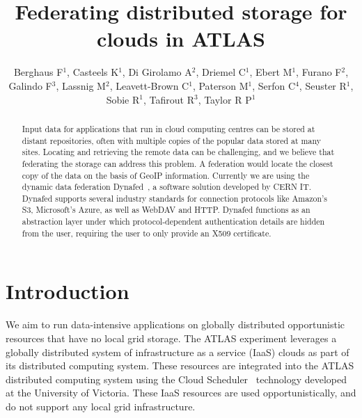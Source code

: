 \documentclass[a4paper]{jpconf}
\begin{document}
\title{Federating distributed storage for clouds in ATLAS}


\author{Berghaus F$^1$, Casteels K$^1$, Di Girolamo A$^2$, Driemel C$^1$, Ebert M$^1$, Furano F$^2$, Galindo F$^3$, Lassnig M$^2$, Leavett-Brown C$^1$, Paterson M$^1$, Serfon C$^4$, Seuster R$^1$, Sobie R$^1$, Tafirout R$^3$, Taylor R P$^1$}
\address{$^1$ University of Victoria, Canada\\$^2$ CERN,  Switzerland\\$^3$ TRIUMF, Canada\\$^4$ University of Oslo, Norway}


\begin{abstract}
Input data for applications that run in cloud computing centres can be stored at distant repositories, often with multiple copies of the popular data stored at many sites. Locating and retrieving the remote data can be challenging, and we believe that federating the storage can address this problem. A federation would locate the closest copy of the data on the basis of GeoIP information. Currently we are using the dynamic data federation Dynafed~\cite{dynafed}, a software solution developed by CERN IT. Dynafed supports several industry standards for connection protocols like Amazon's S3, Microsoft's Azure, as well as WebDAV and HTTP. Dynafed functions as an abstraction layer under which protocol-dependent authentication details are  hidden from the user, requiring the user to only provide an X509 certificate.
\end{abstract}

\section{Introduction}
We aim to run data-intensive applications on globally distributed opportunistic resources that have no local grid storage. The ATLAS experiment leverages a globally distributed system of infrastructure as a service (IaaS) clouds as part of its distributed computing system. These resources are integrated into the ATLAS distributed computing system using the Cloud Scheduler~\cite{cloud-scheduler} technology developed at the University of Victoria. These IaaS resources are used opportunistically, and do not support any local grid infrastructure.
\end{document}
